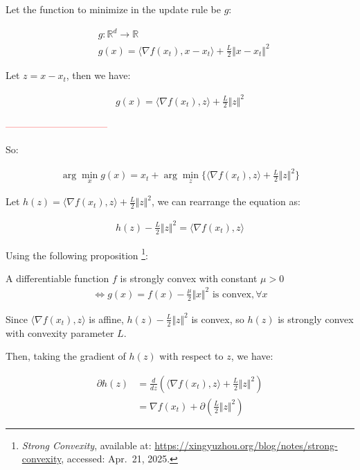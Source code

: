 \documentclass{article}
\begin{document}
Let the function to minimize in the update rule be $g$: 

\begin{align*}
    &g: \mathbb{R}^d \to \mathbb{R} \\
    &g(x) = \langle \nabla f(x_t), x - x_t \rangle + \frac{L}{2} \Vert x - x_t \Vert^2 
\end{align*}

Let $z = x - x_t$, then we have:

\begin{align*}
    g(x) = \langle \nabla f(x_t), z \rangle + \frac{L}{2} \Vert z \Vert^2 
\end{align*}

\textcolor{red}{--------------------------------}

So:

\begin{align*}
    \arg \min_x g(x) = x_t + \arg \min_z \{\langle \nabla f(x_t), z \rangle + \frac{L}{2} \Vert z \Vert^2 \}
\end{align*}

Let $h(z) = \langle \nabla f(x_t), z \rangle + \frac{L}{2} \Vert z \Vert^2$, we can rearrange the equation as:

\begin{align*}
    h(z) - \frac{L}{2} \Vert z \Vert^2 = \langle \nabla f(x_t), z \rangle
\end{align*}

Using the following proposition
\footnote{\textit{Strong Convexity}, available at: \url{https://xingyuzhou.org/blog/notes/strong-convexity}, accessed: Apr.~21, 2025.}:

\begin{tcolorbox}[greenbox, title = Proposition: Equivalent conditions of strong convexity]
    A differentiable function $f$ is strongly convex with constant $\mu > 0$
    \begin{align*}
        \Leftrightarrow g(x) = f(x) - \frac{\mu}{2} \Vert x \Vert^2 \text{ is convex}, \forall x
    \end{align*}
\end{tcolorbox}

Since $\langle \nabla f(x_t), z \rangle$ is affine, $h(z) - \frac{L}{2} \Vert z \Vert^2$ is convex,
so $h(z)$ is strongly convex with convexity parameter $L$.
\bigskip

Then, taking the gradient of $h(z)$ with respect to $z$, we have:

\begin{align*}
    \partial h(z)
    &= \frac{d}{dz} \left( \langle \nabla f(x_t), z \rangle + \frac{L}{2} \Vert z \Vert^2 \right) \\
    &= \nabla f(x_t) + \partial \left( \frac{L}{2} \Vert z \Vert^2 \right) 
\end{align*}
\end{document}
